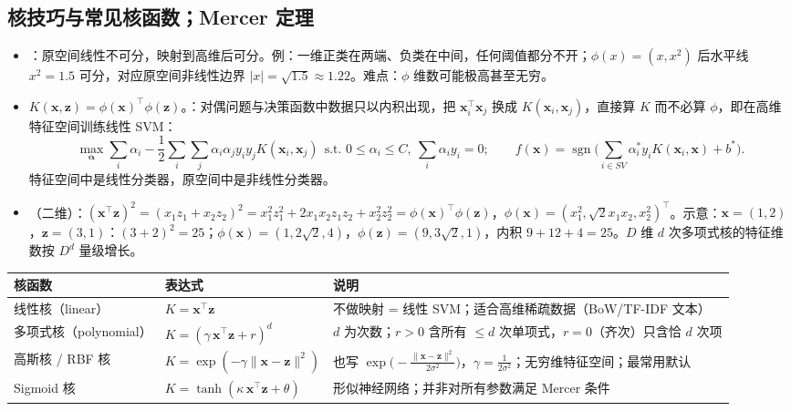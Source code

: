 \subsection{核技巧与常见核函数；Mercer 定理 \tagext}
\begin{itemize}
\item {}：原空间线性不可分，映射到高维后可分。例：一维正类在两端、负类在中间，任何阈值都分不开；$\phi(x)=(x,x^2)$ 后水平线 $x^2=1.5$ 可分，对应原空间非线性边界 $|x|=\sqrt{1.5}\approx1.22$。难点：$\phi$ 维数可能极高甚至无穷。
\item {} $K(\bm x,\bm z)=\phi(\bm x)^\top\phi(\bm z)$。：对偶问题与决策函数中数据只以内积出现，把 $\bm x_i^\top\bm x_j$ 换成 $K(\bm x_i,\bm x_j)$，直接算 $K$ 而不必算 $\phi$，即在高维特征空间训练线性 SVM：
\[
\max_{\bm\alpha}\sum_i\alpha_i-\frac12\sum_i\sum_j\alpha_i\alpha_jy_iy_jK(\bm x_i,\bm x_j)\ \ \text{s.t. }0\le\alpha_i\le C,\ \sum_i\alpha_iy_i=0;\qquad f(\bm x)=\operatorname{sgn}\Big(\sum_{i\in SV}\alpha_i^*y_iK(\bm x_i,\bm x)+b^*\Big).
\]
特征空间中是线性分类器，原空间中是非线性分类器。
\item {}（二维）：$(\bm x^\top\bm z)^2=(x_1z_1+x_2z_2)^2=x_1^2z_1^2+2x_1x_2z_1z_2+x_2^2z_2^2=\phi(\bm x)^\top\phi(\bm z)$，$\phi(\bm x)=(x_1^2,\sqrt2x_1x_2,x_2^2)^\top$。示意：$\bm x=(1,2)$，$\bm z=(3,1)$：$(3+2)^2=25$；$\phi(\bm x)=(1,2\sqrt2,4)$，$\phi(\bm z)=(9,3\sqrt2,1)$，内积 $9+12+4=25$。$D$ 维 $d$ 次多项式核的特征维数按 $D^d$ 量级增长。
\end{itemize}
\begin{center}\small
\begin{tabularx}{\linewidth}{@{}p{3.6cm}p{4.2cm}L@{}}
\toprule
核函数 & 表达式 & 说明 \\
\midrule
线性核（linear） & $K=\bm x^\top\bm z$ & 不做映射 = 线性 SVM；适合高维稀疏数据（BoW/TF-IDF 文本） \\
多项式核（polynomial） & $K=(\gamma\,\bm x^\top\bm z+r)^d$ & $d$ 为次数；$r>0$ 含所有 $\le d$ 次单项式，$r=0$（齐次）只含恰 $d$ 次项 \\
高斯核 / RBF 核 & $K=\exp(-\gamma\|\bm x-\bm z\|^2)$ & 也写 $\exp\!\big(-\frac{\|\bm x-\bm z\|^2}{2\sigma^2}\big)$，$\gamma=\frac1{2\sigma^2}$；无穷维特征空间；最常用默认 \\
Sigmoid 核 & $K=\tanh(\kappa\,\bm x^\top\bm z+\theta)$ & 形似神经网络；并非对所有参数满足 Mercer 条件 \\
\bottomrule
\end{tabularx}
\end{center}
